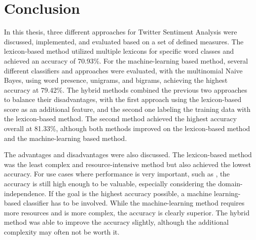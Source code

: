 \chapter{Conclusion}
\label{cha:Chapter5_Conclusion}

\iffalse

Length: 1-2 pages

Effort: 1-2 days


Zusammenfassung der Ergebnisse, Ausblick --> was kann man noch machen, auf Ergebnisse aufbauen, weiterfuehrende Themen

Beim Erstellen der Arbeit --> nicht jeder Idee hinterherrennen, eher dann fuer Conclusion

Implementation source code --> muss nicht sein, kann auch ein link auf github sein

\fi

In this thesis, three different approaches for Twitter Sentiment Analysis were discussed, implemented, and evaluated based on a set of defined measures. The lexicon-based method utilized multiple lexicons for specific word classes and achieved an accuracy of 70.93\%. For the machine-learning based method, several different classifiers and approaches were evaluated, with the multinomial Naive Bayes, using word presence, unigrams, and bigrams, achieving the highest accuracy at 79.42\%. The hybrid methods combined the previous two approaches to balance their disadvantages, with the first approach using the lexicon-based score as an additional feature, and the second one labeling the training data with the lexicon-based method. The second method achieved the highest accuracy overall at 81.33\%, although both methods improved on the lexicon-based method and the machine-learning based method.

The advantages and disadvantages were also discussed. The lexicon-based method was the least complex and resource-intensive method but also achieved the lowest accuracy. For use cases where performance is very important, such as , the accuracy is still high enough to be valuable, especially considering the domain-independence. If the goal is the highest accuracy possible, a machine learning-based classifier has to be involved. While the machine-learning method requires more resources and is more complex, the accuracy is clearly superior. The hybrid method was able to improve the accuracy slightly, although the additional complexity may often not be worth it.

